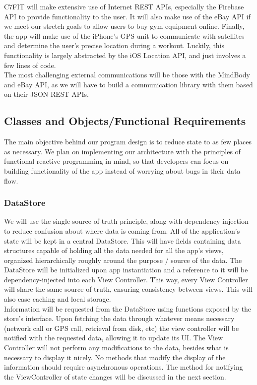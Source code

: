 \documentclass[letterpaper,10pt,titlepage]{article}
\begin{document}
C7FIT will make extensive use of Internet REST APIs, especially the Firebase API to provide functionality to the user. It will also make use of the eBay API if we meet our stretch goals to allow users to buy gym equipment online. Finally, the app will make use of the iPhone’s GPS unit to communicate with satellites and determine the user’s precise location during a workout. Luckily, this functionality is largely abstracted by the iOS Location API, and just involves a few lines of code.\\

The most challenging external communications will be those with the MindBody and eBay API, as we will have to build a communication library with them based on their JSON REST APIs.\\

\subsection{Classes and Objects/Functional Requirements}

The main objective behind our program design is to reduce state to as few places as necessary. We plan on implementing our architecture with the principles of functional reactive programming in mind, so that developers can focus on building functionality of the app instead of worrying about bugs in their data flow.\\

\subsubsection{DataStore}

We will use the single-source-of-truth principle, along with dependency injection to reduce confusion about where data is coming from. All of the application’s state will be kept in a central DataStore. This will have fields containing data structures capable of holding all the data needed for all the app’s views, organized hierarchically roughly around the purpose / source of the data. The DataStore will be initialized upon app instantiation and a reference to it will be dependency-injected into each View Controller. This way, every View Controller will share the same source of truth, ensuring consistency between views. This will also ease caching and local storage.\\

Information will be requested from the DataStore using functions exposed by the store’s interface. Upon fetching the data through whatever means necessary (network call or GPS call, retrieval from disk, etc) the view controller will be notified with the requested data, allowing it to update its UI. The View Controller will not perform any modifications to the data, besides what is necessary to display it nicely. No methods that modify the display of the information should require asynchronous operations. The method for notifying the ViewController of state changes will be discussed in the next section.
\end{document}
